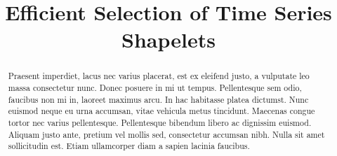 \documentclass[sigconf, nonacm]{acmart}
\begin{document}
\title{Efficient Selection of Time Series Shapelets}





\newcommand{\mc}[1]{\textcolor{teal}{ --- MC: #1 --- }}
\newcommand{\ac}[1]{\textcolor{orange}{ --- AC: #1 --- }}
\newcommand{\jg}[1]{\textcolor{red}{ --- JG: #1 --- }}


\begin{abstract}
	Praesent imperdiet, lacus nec varius placerat, est ex eleifend justo, a vulputate leo massa consectetur nunc. Donec posuere in mi ut tempus. Pellentesque sem odio, faucibus non mi in, laoreet maximus arcu. In hac habitasse platea dictumst. Nunc euismod neque eu urna accumsan, vitae vehicula metus tincidunt. Maecenas congue tortor nec varius pellentesque. Pellentesque bibendum libero ac dignissim euismod. Aliquam justo ante, pretium vel mollis sed, consectetur accumsan nibh. Nulla sit amet sollicitudin est. Etiam ullamcorper diam a sapien lacinia faucibus.
\end{abstract}

\maketitle
\end{document}
